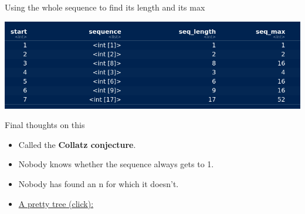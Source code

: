 \documentclass[ignorenonframetext,]{beamer}
\newenvironment{Shaded}{\begin{snugshade}}{\end{snugshade}}
\newcommand{\DataTypeTok}[1]{\textcolor[rgb]{0.13,0.29,0.53}{#1}}
\newcommand{\DecValTok}[1]{\textcolor[rgb]{0.00,0.00,0.81}{#1}}
\newcommand{\KeywordTok}[1]{\textcolor[rgb]{0.13,0.29,0.53}{\textbf{#1}}}
\newcommand{\NormalTok}[1]{#1}
\newcommand{\OperatorTok}[1]{\textcolor[rgb]{0.81,0.36,0.00}{\textbf{#1}}}
\newcommand{\StringTok}[1]{\textcolor[rgb]{0.31,0.60,0.02}{#1}}
\providecommand{\tightlist}{%
  \setlength{\itemsep}{0pt}\setlength{\parskip}{0pt}}
\begin{document}
\begin{frame}[fragile]{Using the whole sequence to find its length and
its max}
\protect\hypertarget{using-the-whole-sequence-to-find-its-length-and-its-max}{}

\begin{Shaded}
\end{Shaded}

\includegraphics{Screenshot_2019-05-07_13-47-08.png}

\end{frame}

\begin{frame}{Final thoughts on this}
\protect\hypertarget{final-thoughts-on-this}{}

\begin{itemize}
\tightlist
\item
  Called the \textbf{Collatz conjecture}.
\item
  Nobody knows whether the sequence always gets to 1.
\item
  Nobody has found an n for which it doesn't.
\item
  \href{https://en.wikipedia.org/wiki/Collatz_conjecture\#/media/File:Collatz-graph-all-30-no27.svg}{A
  pretty tree (click):}
\end{itemize}

\end{frame}
\end{document}

